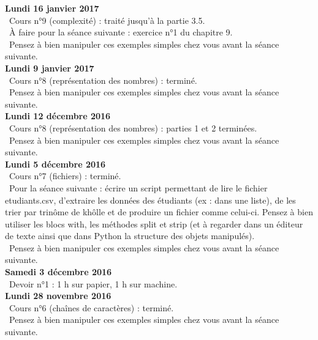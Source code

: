 \documentclass[12pt,a4paper]{article}
\begin{document}
\noindent\textbf{Lundi 16 janvier 2017}\\
\bu\ Cours n°9 (complexité) : traité jusqu'à la partie 3.5. \\
\bu\ À faire pour la séance suivante : exercice n°1 du chapitre 9.\\
\bu\ Pensez à bien manipuler ces exemples simples chez vous avant la séance suivante. \vspace{.4cm}\\

\noindent\textbf{Lundi 9 janvier 2017}\\
\bu\ Cours n°8 (représentation des nombres) : terminé. \\
\bu\ Pensez à bien manipuler ces exemples simples chez vous avant la séance suivante. \vspace{.4cm}\\

\noindent\textbf{Lundi 12 décembre 2016 }\\
\bu\ Cours n°8 (représentation des nombres) : parties 1 et 2 terminées. \\
\bu\ Pensez à bien manipuler ces exemples simples chez vous avant la séance suivante. \vspace{.4cm}\\

\noindent\textbf{Lundi 5 décembre 2016 }\\
\bu\ Cours n°7 (fichiers) : terminé. \\
\bu\ Pour la séance suivante : écrire un script permettant de lire le fichier etudiants.csv, d'extraire les données des étudiants (ex : dans une liste), de les trier par trinôme de khôlle et de produire un fichier comme celui-ci. 
Pensez à bien utiliser les blocs with, les méthodes split et strip (et à regarder dans un éditeur de texte ainsi que dans Python la structure des objets manipulés). \\
\bu\ Pensez à bien manipuler ces exemples simples chez vous avant la séance suivante. \vspace{.4cm}\\

\noindent\textbf{Samedi 3 décembre 2016}\\
\bu\ Devoir n°1 : 1 h sur papier, 1 h sur machine.\vspace{.4cm}\\

\noindent\textbf{Lundi 28 novembre 2016 }\\
\bu\ Cours n°6 (chaînes de caractères) : terminé. \\
\bu\ Pensez à bien manipuler ces exemples simples chez vous avant la séance suivante. \vspace{.4cm}\\
\end{document}

